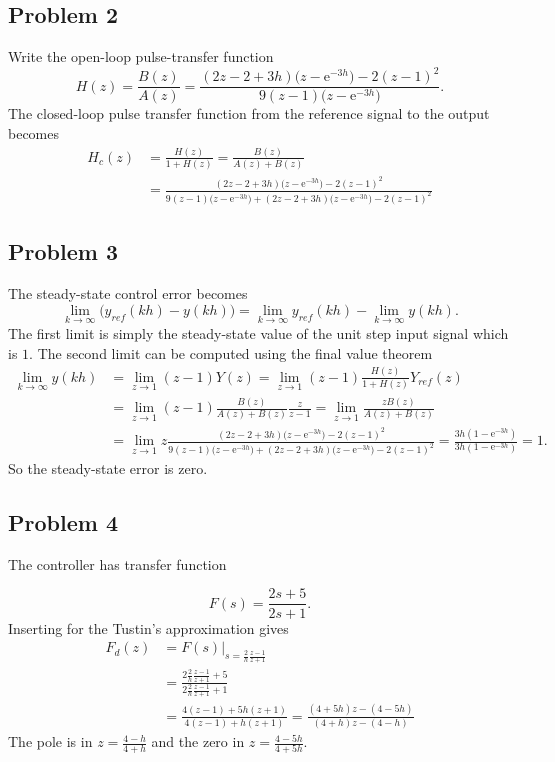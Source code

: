 \documentclass[a4paper,12pt]{article}
\newcommand*{\zethree}{\big(z - \mexp{-3h}\big)}
\newcommand*{\mexp}[1]{\ensuremath{\mathrm{e}^{#1}}}
\begin{document}
\subsection*{Problem 2}
Write the open-loop pulse-transfer function 
\[ H(z) = \frac{B(z)}{A(z)} = \frac{(2z-2+3h)\zethree - 2(z-1)^2}{9(z-1)\zethree{}}. \]
The closed-loop pulse transfer function from the reference signal to the output becomes
\begin{equation*}
\begin{split}
  H_c(z) &= \frac{H(z)}{1+H(z)} = \frac{B(z)}{A(z) + B(z)}\\
  &= \frac{(2z-2+3h)\zethree - 2(z-1)^2}{ 9(z-1)\zethree{} + (2z-2+3h)\zethree - 2(z-1)^2}
\end{split}
\end{equation*}

\subsection*{Problem 3}
The steady-state control error becomes
\[ \lim_{k\to\infty} \big(y_{ref}(kh) - y(kh)\big) = \lim_{k\to\infty} y_{ref}(kh) - \lim_{k\to\infty}  y(kh). \]
The first limit is simply the steady-state value of the unit step input signal which is $1$. The second limit can be computed using the final value theorem
\begin{equation*}
\begin{split}
  \lim_{k\to\infty} y(kh) &= \lim_{z\to 1} (z-1)Y(z) = \lim_{z\to 1} (z-1)\frac{H(z)}{1+H(z)} Y_{ref}(z)\\
  &= \lim_{z\to 1} (z-1) \frac{B(z)}{A(z) + B(z)} \frac{z}{z-1} = \lim_{z\to 1} \frac{zB(z)}{A(z) + B(z)}\\
  &= \lim_{z\to 1} z \frac{(2z-2+3h)\zethree - 2(z-1)^2}{ 9(z-1)\zethree{} + (2z-2+3h)\zethree - 2(z-1)^2}
  = \frac{3h(1-\mexp{-3h})}{3h(1-\mexp{-3h})} = 1.
\end{split}
\end{equation*}
So the steady-state error is zero. 

\subsection*{Problem 4}
The controller has transfer function

\[ F(s) = \frac{2s + 5}{2s + 1}. \]
Inserting for the Tustin's approximation gives
\begin{equation*}
\begin{split}
  F_d(z) &= F(s)|_{s=\frac{2}{h}\frac{z-1}{z+1}}\\
  &= \frac{2\frac{2}{h}\frac{z-1}{z+1} + 5}{2\frac{2}{h}\frac{z-1}{z+1} + 1}\\
  &= \frac{4(z-1) + 5h(z+1)}{4(z-1) + h(z+1)} = \frac{(4 + 5h)z - (4 -5h)}{(4+h)z - (4 - h)}
\end{split}
\end{equation*}
The pole is in \(z = \frac{4-h}{4+h}\) and the zero in \(z = \frac{4-5h}{4+5h}\).
\end{document}
